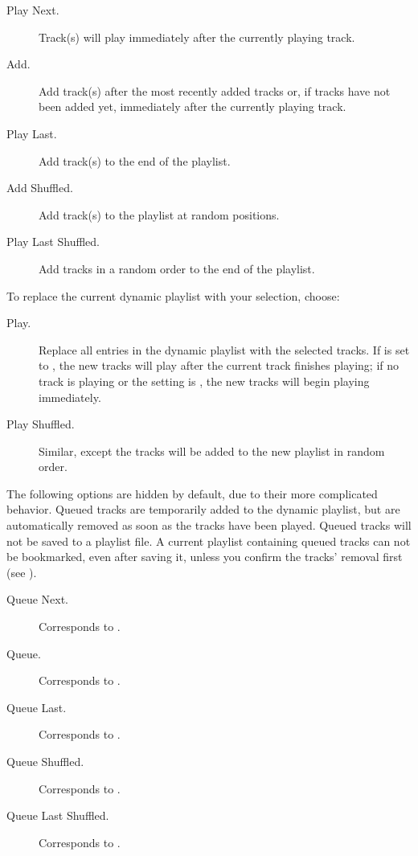 \begin{description}
\item [Play Next.] Track(s) will play immediately after the currently playing track.

\item [Add.] Add track(s) after the most recently added tracks or, if tracks
have not been added yet, immediately after the currently playing track.

\item [Play Last.] Add track(s) to the end of the playlist.

\item [Add Shuffled.] Add track(s) to the playlist at random positions.

\item [Play Last Shuffled.] Add tracks in a random order to the end of the playlist.
\end{description}

To replace the current dynamic playlist with your selection, choose:

\begin{description}
\item [Play.] Replace all entries in the dynamic playlist with the selected
  tracks. If  is set to
  , the new tracks will play after the current track finishes
  playing; if no track is playing or the setting is , the new
  tracks will begin playing immediately.

\item [Play Shuffled.] Similar, except the tracks will be added to the new
  playlist in random order.
\end{description}

\label{ref:queuing}The following options are hidden by default, due to their
more complicated behavior. Queued tracks are temporarily added to the dynamic
playlist, but are automatically removed as soon as the tracks have been played.
Queued tracks will not be saved to a playlist file.
A current playlist containing queued tracks can not be bookmarked, even after saving it,
unless you confirm the tracks' removal first (see ).

\begin{description}
\item [Queue Next.] Corresponds to .

\item [Queue.] Corresponds to .

\item [Queue Last.] Corresponds to .

\item [Queue Shuffled.] Corresponds to .

\item [Queue Last Shuffled.] Corresponds to .
\end{description}

